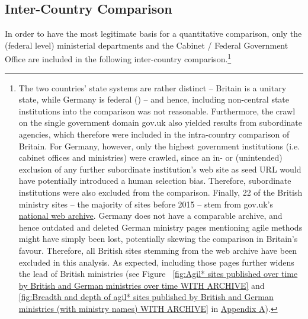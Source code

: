 \subsection{Inter-Country Comparison}\label{Inter-Country Comparison} 
\begin{wrapfigure}[10]{r}{0.5\textwidth}
	\centering
	 \texttt{[image: \{"Code/3\_Data\_Analysis/visualisations/british\_vs\_German\_federal\_ministries\_over\_time\_without\_archive"]}.pdf}
	 \setlength{\belowcaptionskip}{-30pt}
	 \caption[Agil* sites published by British and German ministries over time]{Agil* sites published by British and German ministries over time}
	 \label{fig:Agil* sites published over time by British and German ministries over time}
\end{wrapfigure}
In order to have the most legitimate basis for a quantitative comparison, only the (federal level) ministerial departments and the Cabinet / Federal Government Office are included in the following inter-country comparison.\footnote{The two countries' state systems are rather distinct – Britain is a unitary state, while Germany is federal (\cite{Elazar1997}) – and hence, including non-central state institutions into the comparison was not reasonable. Furthermore, the crawl on the single government domain gov.uk also yielded results from subordinate agencies, which therefore were included in the intra-country comparison of Britain. For Germany, however, only the highest government institutions (i.e. cabinet offices and ministries) were crawled, since an in- or (unintended) exclusion of any further subordinate institution's web site as seed URL would have potentially introduced a human selection bias. Therefore, subordinate institutions were also excluded from the comparison. Finally, 22 of the British ministry sites – the majority of sites before 2015 – stem from gov.uk's \href{https://webarchive.nationalarchives.gov.uk/search/}{national web archive}. Germany does not have a comparable archive, and hence outdated and deleted German ministry pages mentioning agile methods might have simply been lost, potentially skewing the comparison in Britain's favour. Therefore, all British sites stemming from the web archive have been excluded in this analysis. As expected, including those pages further widens the lead of British ministries (see Figure
~\ref{fig:Agil* sites published over time by British and German ministries over time WITH ARCHIVE} and \ref{fig:Breadth and depth of agil* sites published by British and German ministries (with ministry names) WITH ARCHIVE} in \hyperref[Appendix A]{Appendix A}).} 

